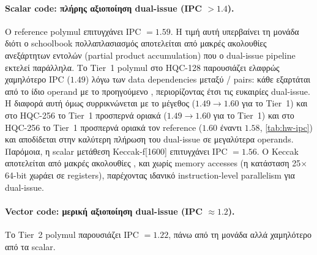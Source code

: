 \paragraph{Scalar code: πλήρης αξιοποίηση dual-issue (IPC $> 1.4$).}
Ο reference polymul επιτυγχάνει IPC $= 1.59$. 
Η τιμή αυτή υπερβαίνει τη μονάδα διότι ο
schoolbook πολλαπλασιασμός αποτελείται από μακρές ακολουθίες ανεξάρτητων
 εντολών (partial product accumulation) που ο dual-issue
pipeline εκτελεί παράλληλα. Το Tier~1 polymul στο HQC-128 παρουσιάζει
ελαφρώς χαμηλότερο IPC ($1.49$) λόγω των data dependencies μεταξύ
/ pairs: κάθε  εξαρτάται από το
ίδιο operand με το προηγούμενο , περιορίζοντας έτσι τις ευκαιρίες
dual-issue. Η διαφορά αυτή όμως συρρικνώνεται με το μέγεθος
($1.49 \to 1.60$ για το Tier~1) και στο HQC-256 το Tier~1 προσπερνά οριακά
($1.49 \to 1.60$ για το Tier~1) και στο HQC-256 το Tier~1 προσπερνά οριακά
τον reference ($1.60$ έναντι $1.58$, \cref{tab:hw-ipc}) και αποδίδεται στην καλύτερη πλήρωση του
dual-issue σε μεγαλύτερα operands. Παρόμοια, η scalar μετάθεση 
Keccak-f[1600] επιτυγχάνει IPC $= 1.56$. Ο Keccak αποτελείται από μακρές
ακολουθίες ,  και 
χωρίς memory accesses (η κατάσταση 25$\times$64-bit χωράει σε registers),
παρέχοντας ιδανικό instruction-level parallelism για dual-issue.

\paragraph{Vector code: μερική αξιοποίηση dual-issue (IPC $\approx 1.2$).}
Το Tier~2 polymul παρουσιάζει IPC $= 1.22$, πάνω από τη
μονάδα αλλά χαμηλότερο από τα scalar. 

